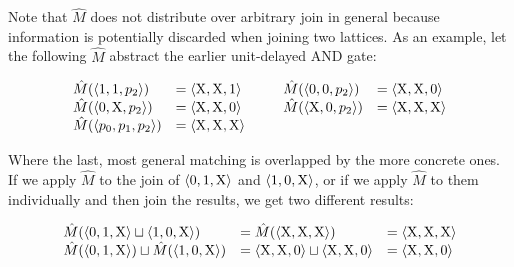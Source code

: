 Note that $\hat M$ does not distribute over arbitrary join in general because information is potentially discarded when joining two lattices. As an example, let the following $\hat M$ abstract the earlier unit-delayed AND gate:



\begin{equation*}
\begin{array}{llll}
  \hat M(\langle 1, 1, p_{2} \rangle) & = \langle \mathrm{X}, \mathrm{X}, 1 \rangle \qquad & \hat M(\langle 0, 0, p_{2} \rangle) & = \langle \mathrm{X}, \mathrm{X}, 0 \rangle \\
  \hat M(\langle 0, \mathrm{X}, p_{2} \rangle) & = \langle \mathrm{X}, \mathrm{X}, 0 \rangle & \hat M(\langle \mathrm{X}, 0, p_{2} \rangle) & = \langle \mathrm{X}, \mathrm{X}, \mathrm{X} \rangle \\
  \hat M(\langle p_{0}, p_{1}, p_{2} \rangle) & = \langle \mathrm{X}, \mathrm{X}, \mathrm{X} \rangle & &
\end{array}
\end{equation*}


\noindent Where the last, most general matching is overlapped by the more concrete ones. If we apply $\hat M$ to the join of $\langle 0, 1, \mathrm{X} \rangle$ and $\langle 1, 0, \mathrm{X} \rangle$, or if we apply $\hat M$ to them individually and then join the results, we get two different results:

\begin{equation*}
\begin{array}{lll}
  \hat M(\langle 0, 1, \mathrm{X} \rangle \sqcup \langle 1, 0, \mathrm{X} \rangle) &= \hat M(\langle \mathrm{X}, \mathrm{X}, \mathrm{X} \rangle) &= \langle \mathrm{X}, \mathrm{X}, \mathrm{X} \rangle \\
  \hat M(\langle 0, 1, \mathrm{X} \rangle) \sqcup \hat M(\langle 1, 0, \mathrm{X} \rangle) &= \langle \mathrm{X}, \mathrm{X}, 0 \rangle \sqcup \langle \mathrm{X}, \mathrm{X}, 0 \rangle &= \langle \mathrm{X}, \mathrm{X}, 0 \rangle
\end{array}
\end{equation*}

